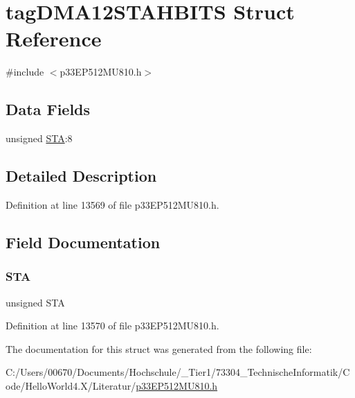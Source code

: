 \hypertarget{structtag_d_m_a12_s_t_a_h_b_i_t_s}{}\section{tag\+D\+M\+A12\+S\+T\+A\+H\+B\+I\+TS Struct Reference}
\label{structtag_d_m_a12_s_t_a_h_b_i_t_s}


{\ttfamily \#include $<$p33\+E\+P512\+M\+U810.\+h$>$}

\subsection*{Data Fields}
\begin{DoxyCompactItemize}
\item 
unsigned \hyperlink{structtag_d_m_a12_s_t_a_h_b_i_t_s_a0eec78ddd2c12af678d5fab70fe62d14}{S\+TA}\+:8
\end{DoxyCompactItemize}


\subsection{Detailed Description}


Definition at line 13569 of file p33\+E\+P512\+M\+U810.\+h.



\subsection{Field Documentation}
\mbox{\label{structtag_d_m_a12_s_t_a_h_b_i_t_s_a0eec78ddd2c12af678d5fab70fe62d14}} 
\subsubsection{\texorpdfstring{S\+TA}{STA}}
{\footnotesize\ttfamily unsigned S\+TA}



Definition at line 13570 of file p33\+E\+P512\+M\+U810.\+h.



The documentation for this struct was generated from the following file\+:\begin{DoxyCompactItemize}
\item 
C\+:/\+Users/00670/\+Documents/\+Hochschule/\+\_\+\+Tier1/73304\+\_\+\+Technische\+Informatik/\+Code/\+Hello\+World4.\+X/\+Literatur/\hyperlink{p33_e_p512_m_u810_8h}{p33\+E\+P512\+M\+U810.\+h}\end{DoxyCompactItemize}
